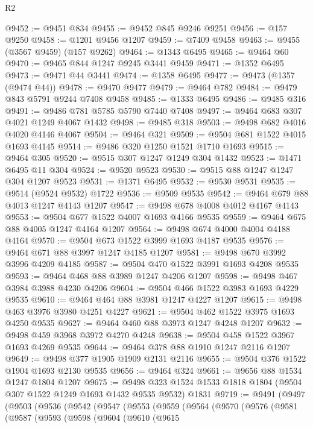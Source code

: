 \begin{lexlean}{R2}
\begin{coremodule}
@9452 := @9451 @834
@9455 := @9452 @845 @9246 @9251
@9456 := @157 @9250
@9458 := @1201 @9456 @1207
@9459 := @7409 @9458
@9463 := @9455 (@3567 @9459) (@157 @9262)
@9464 := @1343 @6495
@9465 := @9464 @60
@9470 := @9465 @844 @1247 @9245 @3441 @9459
@9471 := @1352 @6495
@9473 := @9471 @44 @3441
@9474 := @1358 @6495
@9477 := @9473 (@1357 (@9474 @44))
@9478 := @9470 @9477
@9479 := @9464 @782
@9484 := @9479 @843 @5791 @9244 @7408 @9458
@9485 := @1333 @6495
@9486 := @9485 @316
@9491 := @9486 @781 @5785 @5790 @7440 @7408
@9497 := @9464 @683 @307 @4021 @1249 @4067 @1432
@9498 := @9485 @318
@9503 := @9498 @682 @4016 @4020 @4146 @4067
@9504 := @9464 @321
@9509 := @9504 @681 @1522 @4015 @1693 @4145
@9514 := @9486 @320 @1250 @1521 @1710 @1693
@9515 := @9464 @305
@9520 := @9515 @307 @1247 @1249 @304 @1432
@9523 := @1471 @6495 @11 @304
@9524 := @9520 @9523
@9530 := @9515 @88 @1247 @1247 @304 @1207 @9523
@9531 := @1371 @6495
@9532 := @9530 @9531
@9535 := @9514 (@9524 @9532) @1722
@9536 := @9509 @9535
@9542 := @9464 @679 @88 @4013 @1247 @4143 @1207
@9547 := @9498 @678 @4008 @4012 @4167 @4143
@9553 := @9504 @677 @1522 @4007 @1693 @4166 @9535
@9559 := @9464 @675 @88 @4005 @1247 @4164 @1207
@9564 := @9498 @674 @4000 @4004 @4188 @4164
@9570 := @9504 @673 @1522 @3999 @1693 @4187 @9535
@9576 := @9464 @671 @88 @3997 @1247 @4185 @1207
@9581 := @9498 @670 @3992 @3996 @4209 @4185
@9587 := @9504 @470 @1522 @3991 @1693 @4208 @9535
@9593 := @9464 @468 @88 @3989 @1247 @4206 @1207
@9598 := @9498 @467 @3984 @3988 @4230 @4206
@9604 := @9504 @466 @1522 @3983 @1693 @4229 @9535
@9610 := @9464 @464 @88 @3981 @1247 @4227 @1207
@9615 := @9498 @463 @3976 @3980 @4251 @4227
@9621 := @9504 @462 @1522 @3975 @1693 @4250 @9535
@9627 := @9464 @460 @88 @3973 @1247 @4248 @1207
@9632 := @9498 @459 @3968 @3972 @4270 @4248
@9638 := @9504 @458 @1522 @3967 @1693 @4269 @9535
@9644 := @9464 @378 @88 @1910 @1247 @2116 @1207
@9649 := @9498 @377 @1905 @1909 @2131 @2116
@9655 := @9504 @376 @1522 @1904 @1693 @2130 @9535
@9656 := @9464 @324
@9661 := @9656 @88 @1534 @1247 @1804 @1207
@9675 := @9498 @323 @1524 @1533 @1818 @1804 (@9504 @307 @1522 @1249 @1693 @1432 @9535 @9532) @1831
@9719 := @9491
    (@9497
      (@9503
        (@9536
          (@9542
            (@9547
              (@9553
                (@9559
                  (@9564
                    (@9570
                      (@9576
                        (@9581
                          (@9587
                            (@9593
                              (@9598
                                (@9604
                                  (@9610
                                    (@9615

\end{coremodule}
\end{lexlean}
